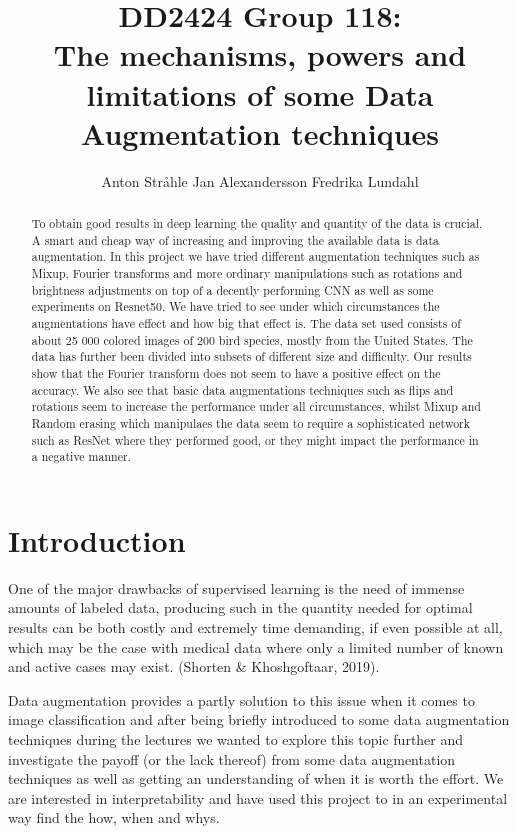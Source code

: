 \documentclass{article}
\title{DD2424 Group 118: \\ The mechanisms, powers and limitations of some Data Augmentation techniques}
\author{%
  Anton Stråhle \And Jan Alexandersson \And Fredrika Lundahl}
\begin{document}
	
\maketitle

\begin{abstract}


To obtain good results in deep learning the quality and quantity of the data is crucial. A smart and cheap way of increasing and 
improving the available data is data augmentation. In this project we have tried different 
augmentation techniques such as Mixup, Fourier transforms and more ordinary manipulations 
such as rotations and brightness adjustments on top of a decently performing CNN as well as some experiments on 
Resnet50. We have tried to see under which circumstances the augmentations have effect and how big that 
effect is. The data set used consists of about 25 000 colored images of 200 bird species, mostly from the United States. 
The data has further been divided into subsets of different size and difficulty. Our results show that the 
Fourier transform does not seem to have a positive effect on the accuracy. 
We also see that basic data augmentations techniques such as flips and rotations seem to increase the performance under all circumstances, whilst Mixup and Random erasing which manipulaes the data seem to require a sophisticated network such as ResNet where they performed good, or they might impact the performance in a negative manner.


\end{abstract}

\section{Introduction}

% 

One of the major drawbacks of supervised learning is the need of immense amounts of labeled data, producing such in the quantity needed for optimal results can be both costly and extremely time demanding, if even possible at all, which may be the case with medical data where only a limited number of known and active cases may exist.  (Shorten \& Khoshgoftaar, 2019). 

Data augmentation provides a partly solution to this issue when it comes to image classification and after being briefly introduced to some data augmentation techniques during the lectures we wanted to explore this topic further and investigate the payoff (or the lack thereof) from some data augmentation techniques as well as getting an understanding of when it is worth the effort. We are interested in interpretability and have used this project to in an experimental way find the how, when and whys. 
\end{document}
